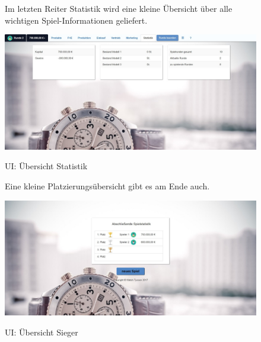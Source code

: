\begin{figure}
	\begin{minipage}{\textwidth}
Im letzten Reiter Statistik wird eine kleine Übersicht über alle wichtigen Spiel-Informationen geliefert.\\
	\end{minipage}
	\centering
	\includegraphics[scale=0.3]{img/bilder_layout/statistik.jpeg}
	\label{fig:abb22}
	\caption{UI: Übersicht Statistik} 
\end{figure}

\begin{figure} [H]
	\begin{minipage}{\textwidth}
Eine kleine Platzierungsübersicht gibt es am Ende auch.\\
	\end{minipage}
	\centering
	\includegraphics[scale=0.3]{img/bilder_layout/sieger.jpeg}
	\label{fig:abb23}
	\caption{UI: Übersicht Sieger}
\end{figure}